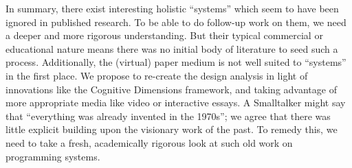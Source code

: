 In summary, there exist interesting holistic ``systems'' which seem to
have been ignored in published research. To be able to do follow-up work
on them, we need a deeper and more rigorous understanding. But their
typical commercial or educational nature means there was no initial body
of literature to seed such a process. Additionally, the (virtual) paper
medium is not well suited to ``systems'' in the first place. We propose
to re-create the design analysis in light of innovations like the
Cognitive Dimensions framework, and taking advantage of more appropriate
media like video or interactive essays. A Smalltalker might say that
``everything was already invented in the 1970s''; we agree that there
was little explicit building upon the visionary work of the past. To
remedy this, we need to take a fresh, academically rigorous look at such
old work on programming systems.
